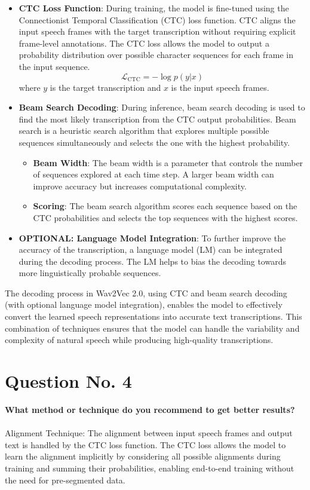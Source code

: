 \documentclass{article}
\begin{document}
\begin{itemize}

  \item \textbf{CTC Loss Function}: During training, the model is fine-tuned using the Connectionist Temporal Classification (CTC) loss function. CTC aligns the input speech frames with the target transcription without requiring explicit frame-level annotations. The CTC loss allows the model to output a probability distribution over possible character sequences for each frame in the input sequence.
  \[
  \mathcal{L}_{\text{CTC}} = -\log p(y | x)
  \]
  where \( y \) is the target transcription and \( x \) is the input speech frames.

  \item \textbf{Beam Search Decoding}: During inference, beam search decoding is used to find the most likely transcription from the CTC output probabilities. Beam search is a heuristic search algorithm that explores multiple possible sequences simultaneously and selects the one with the highest probability.
  \begin{itemize}
    \item \textbf{Beam Width}: The beam width is a parameter that controls the number of sequences explored at each time step. A larger beam width can improve accuracy but increases computational complexity.
    \item \textbf{Scoring}: The beam search algorithm scores each sequence based on the CTC probabilities and selects the top sequences with the highest scores.
  \end{itemize}

  \item \textbf{OPTIONAL: Language Model Integration}: To further improve the accuracy of the transcription, a language model (LM) can be integrated during the decoding process. The LM helps to bias the decoding towards more linguistically probable sequences.

\end{itemize}

The decoding process in Wav2Vec 2.0, using CTC and beam search decoding (with optional language model integration), enables the model to effectively convert the learned speech representations into accurate text transcriptions. This combination of techniques ensures that the model can handle the variability and complexity of natural speech while producing high-quality transcriptions.


\pagebreak

\section*{Question No. 4}
\textbf{What method or technique do you recommend to get better results?}\\\\
Alignment Technique: The alignment between input speech frames and output text is handled by the CTC loss function. The CTC loss allows the model to learn the alignment implicitly by considering all possible alignments during training and summing their probabilities, enabling end-to-end training without the need for pre-segmented data.
\end{document}
